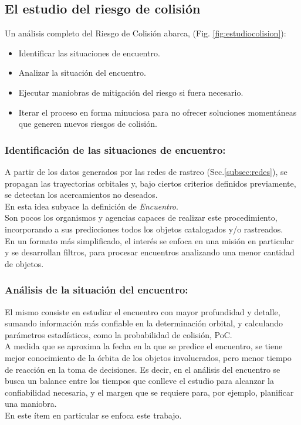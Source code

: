 \subsection{El estudio del riesgo de colisi\'on}\label{subsec:estudiocolision}

Un an\'alisis completo del Riesgo de Colisi\'on abarca, (Fig. \ref{fig:estudiocolision}):

\begin{itemize}
\setlength{\itemsep}{0pt}
\item Identificar las situaciones de encuentro.
\item Analizar la situaci\'on del encuentro.
\item Ejecutar maniobras de mitigaci\'on del riesgo si fuera necesario.
\item Iterar el proceso en forma minuciosa para no ofrecer soluciones moment\'aneas que generen nuevos riesgos de colisi\'on.
\end{itemize}

\subsubsection*{Identificaci\'on de las situaciones de encuentro:}
A partir de los datos generados por las redes de rastreo (Sec.\ref{subsec:redes}), se propagan las trayectorias orbitales y, bajo ciertos criterios definidos previamente, se detectan los acercamientos no deseados.\\
En esta idea subyace la definici\'on de {\it{Encuentro}}.\\
Son pocos los organismos y agencias capaces de realizar este procedimiento, incorporando a sus predicciones todos los objetos catalogados y/o rastreados.\\
En un formato m\'as simplificado, el inter\'es se enfoca en una misi\'on en particular y se desarrollan filtros, para procesar encuentros analizando una menor cantidad de objetos.\\


\subsubsection*{An\'alisis de la situaci\'on del encuentro: }
El mismo consiste en estudiar el encuentro con mayor profundidad y detalle, sumando informaci\'on m\'as confiable en la determinaci\'on orbital, y calculando par\'ametros estad\'isticos, como la probabilidad de colisi\'on, \ac{PoC}.\\
A medida que se aproxima la fecha en la que se predice el encuentro, se tiene mejor conocimiento de la \'orbita de los objetos involucrados, pero menor tiempo de reacci\'on en la toma de decisiones. Es decir, en el an\'alisis del encuentro se busca un balance entre los tiempos que conlleve el estudio para alcanzar la confiabilidad necesaria, y el margen que se requiere para, por ejemplo, planificar una maniobra.\\
En este \'item en particular se enfoca este trabajo.\\

